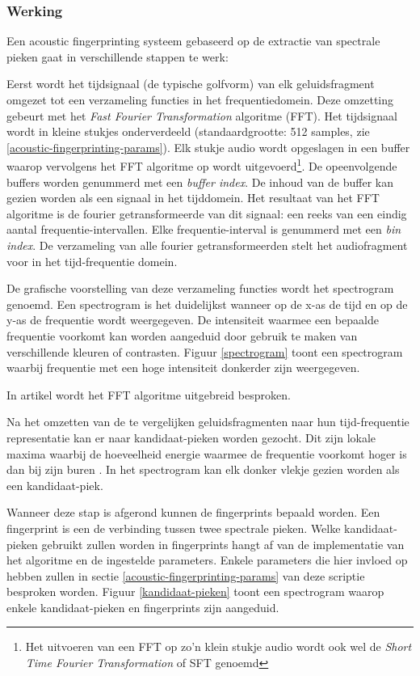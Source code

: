 \subsubsection{Werking}

Een acoustic fingerprinting systeem gebaseerd op de extractie van spectrale pieken gaat in verschillende stappen te werk: 

Eerst wordt het tijdsignaal (de typische golfvorm) van elk geluidsfragment omgezet tot een verzameling functies in het frequentiedomein. Deze omzetting gebeurt met het \textit{Fast Fourier Transformation} algoritme (FFT). Het tijdsignaal wordt in kleine stukjes onderverdeeld (standaardgrootte: 512 samples, zie \ref{acoustic-fingerprinting-params}). Elk stukje audio wordt opgeslagen in een buffer waarop vervolgens het FFT algoritme op wordt uitgevoerd\footnote{Het uitvoeren van een FFT op zo'n klein stukje audio wordt ook wel de \textit{Short Time Fourier Transformation} of SFT genoemd}. De opeenvolgende buffers worden genummerd met een \textit{buffer index}. De inhoud van de buffer kan gezien worden als een signaal in het tijddomein. Het resultaat van het FFT algoritme is de fourier getransformeerde van dit signaal: een reeks van een eindig aantal frequentie-intervallen. Elke frequentie-interval is genummerd met een \textit{bin index}. De verzameling van alle fourier getransformeerden stelt het audiofragment voor in het tijd-frequentie domein. %

De grafische voorstelling van deze verzameling functies wordt het spectrogram genoemd. Een spectrogram is het duidelijkst wanneer op de x-as de tijd en op de y-as de frequentie wordt weergegeven. De intensiteit waarmee een bepaalde frequentie voorkomt kan worden aangeduid door gebruik te maken van verschillende kleuren of contrasten. Figuur \ref{spectrogram} toont een spectrogram waarbij frequentie met een hoge intensiteit donkerder zijn weergegeven.

In artikel \cite{oppenheim1970speech} wordt het FFT algoritme uitgebreid besproken.

Na het omzetten van de te vergelijken geluidsfragmenten naar hun tijd-frequentie representatie kan er naar kandidaat-pieken worden gezocht. Dit zijn lokale maxima waarbij de hoeveelheid energie waarmee de frequentie voorkomt hoger is dan bij zijn buren \cite{six2014panako}. In het spectrogram kan elk donker vlekje gezien worden als een kandidaat-piek.

Wanneer deze stap is afgerond kunnen de fingerprints bepaald worden. Een fingerprint is een de verbinding tussen twee spectrale pieken. Welke kandidaat-pieken gebruikt zullen worden in fingerprints hangt af van de implementatie van het algoritme en de ingestelde parameters. Enkele parameters die hier invloed op hebben zullen in sectie \ref{acoustic-fingerprinting-params} van deze scriptie besproken worden. Figuur \ref{kandidaat-pieken} toont een spectrogram waarop enkele kandidaat-pieken en fingerprints zijn aangeduid.


